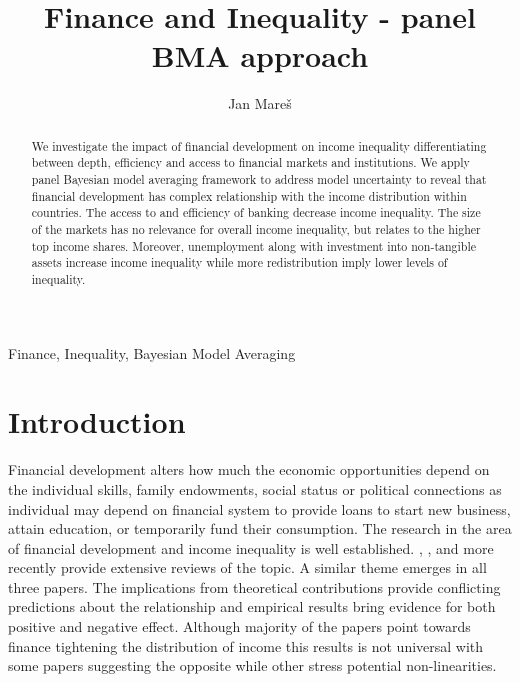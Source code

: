 \documentclass[preprint, nonatbib, 10pt]{elsarticle}
\begin{document}
\begin{frontmatter}

\title{Finance and Inequality - panel BMA approach}

\author[1]{Jan Mare\v{s}}
\address[1]{IES, Faculty of Social Sciences, Charles University, Opletalova 26, Prague}



\begin{abstract}
We investigate the impact of financial development on income inequality differentiating between depth, efficiency and access to financial markets and institutions. We apply panel Bayesian model averaging framework to address model uncertainty to reveal that financial development has complex relationship with the income distribution within countries. The access to and efficiency of banking decrease income inequality. The size of the markets has no relevance for overall income inequality, but relates to the higher top income shares. Moreover, unemployment along with investment into non-tangible assets increase income inequality while more redistribution imply lower levels of inequality.
\end{abstract}

\begin{keyword}
Finance, Inequality, Bayesian Model Averaging
\end{keyword}

\end{frontmatter}


\section{Introduction}
\label{ch4sec:intro}
Financial development alters how much the economic opportunities depend on the individual skills, family endowments, social status or political connections as individual may depend on financial system to provide loans to start new business, attain education, or temporarily fund their consumption. The research in the area of financial development and income inequality is well established. \textcite{demirgucc2009finance}, \textcite{claessens2007finance}, and more recently \cite{de2017finance} provide extensive reviews of the topic. A similar theme emerges in all three papers. The implications from theoretical contributions provide conflicting predictions about the relationship and empirical results bring evidence for both positive and negative effect. Although majority of the papers point towards finance tightening the distribution of income this results is not universal with some papers suggesting the opposite while other stress potential non-linearities.
\end{document}
